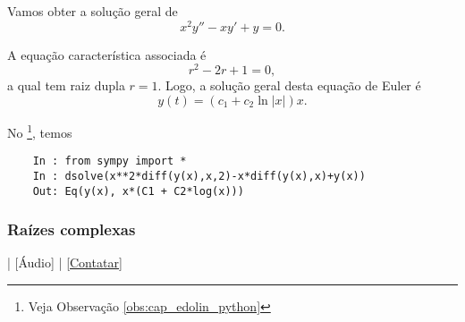 \begin{ex}
  Vamos obter a solução geral de
  \begin{equation}
    x^2y'' - xy' + y = 0.
  \end{equation}

  A equação característica associada é
  \begin{equation}
    r^2 -2r + 1 = 0,
  \end{equation}
  a qual tem raiz dupla $r = 1$. Logo, a solução geral desta equação de Euler é
  \begin{equation}
    y(t) = (c_1 + c_2\ln|x|)x.
  \end{equation}

  \ifispython
  No \python\footnote{Veja Observação \ref{obs:cap_edolin_python}}, temos
  \begin{lstlisting}
    In : from sympy import *
    In : dsolve(x**2*diff(y(x),x,2)-x*diff(y(x),x)+y(x))
    Out: Eq(y(x), x*(C1 + C2*log(x)))
  \end{lstlisting}
  \fi  
\end{ex}

\subsubsection{Raízes complexas}

\begin{flushright}
  [Vídeo] | [Áudio] | \href{https://phkonzen.github.io/notas/contato.html}{[Contatar]}
\end{flushright}

